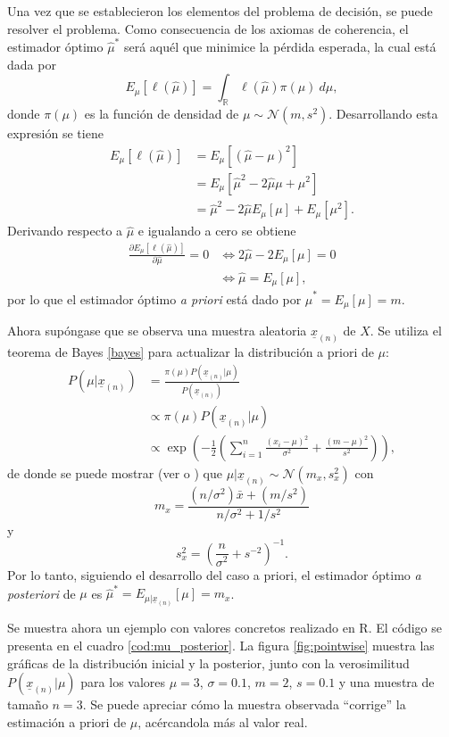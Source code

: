 \documentclass[11pt,a4paper]{article}
\begin{document}
Una vez que se establecieron los elementos del problema de decisión, se puede resolver el problema. Como consecuencia de los axiomas de coherencia, el estimador óptimo $\hat{\mu}^*$ será aquél que minimice la pérdida esperada, la cual está dada por $$E_{\mu}[\ell (\hat{\mu})] = \int_{\mathbb{R}} \ell(\hat{\mu})\pi (\mu) \ d\mu,$$ donde $\pi (\mu)$ es la función de densidad de $\mu \sim \mathcal{N}(m, s^2)$. Desarrollando esta expresión se tiene
\begin{align*}
E_{\mu}[\ell (\hat{\mu})] &= E_{\mu}[(\hat{\mu} - \mu)^2]\\
&=  E_{\mu}[\hat{\mu}^2 - 2\hat{\mu}\mu + \mu^2]\\
&= \hat{\mu}^2 -2\hat{\mu}E_{\mu}[\mu] + E_{\mu}[\mu^2].
\end{align*}
Derivando respecto a $\hat{\mu}$ e igualando a cero se obtiene
\begin{align*}
\frac{\partial E_{\mu}[\ell (\hat{\mu})]}{\partial \hat{\mu}} = 0 &\iff 2\hat{\mu} - 2E_{\mu}[\mu] = 0\\
&\iff \hat{\mu} = E_{\mu}[\mu],
\end{align*}
por lo que el estimador óptimo \textit{a priori} está dado por $\hat{\mu}^* = E_{\mu}[\mu] = m$.

Ahora supóngase que se observa una muestra aleatoria $\underline{x}_{(n)}$ de $X$. Se utiliza el teorema de Bayes \eqref{bayes} para actualizar la distribución a priori de $\mu$:
\begin{align*}
P(\mu | \underline{x}_{(n)}) &= \frac{\pi (\mu) P(\underline{x}_{(n)}|\mu)}{P(\underline{x}_{(n)})}\\
&\propto \pi (\mu) P(\underline{x}_{(n)}|\mu)\\
&\propto \exp\left( -\frac{1}{2} \left( \sum_{i=1}^n \frac{(x_i - \mu)^2}{\sigma^2} + \frac{(m - \mu)^2}{s^2}\right) \right),
\end{align*}
de donde se puede mostrar (ver  \citet{mendoza} o \citet{gelman}) que $\mu | \underline{x}_{(n)} \sim \mathcal{N}(m_x, s_x^2)$ con $$m_x = \frac{(n / \sigma^2) \bar{x} + (m/s^2)}{n/\sigma^2 + 1/s^2}$$ y $$s_x^2 = \left( \frac{n}{\sigma^2} + s^{-2}\right)^{-1}.$$ Por lo tanto, siguiendo el desarrollo del caso a priori, el estimador óptimo \textit{a posteriori} de $\mu$ es $\hat{\mu}^* = E_{\mu | \underline{x}_{(n)}}[\mu] = m_x$.

Se muestra ahora un ejemplo con valores concretos realizado en R.  El código se presenta en el cuadro \ref{cod:mu_posterior}. La figura \ref{fig:pointwise} muestra las gráficas de la distribución inicial y la posterior, junto con la verosimilitud $P(\underline{x}_{(n)}|\mu)$ para los valores $\mu = 3$, $\sigma = 0.1$, $m = 2$, $s = 0.1$ y una muestra de tamaño $n = 3$. Se puede apreciar cómo la muestra observada ``corrige'' la estimación a priori de $\mu$, acércandola más al valor real.
\end{document}
